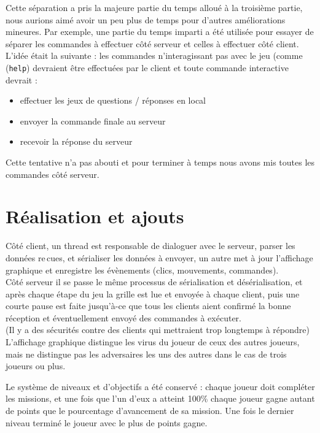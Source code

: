 \documentclass[a4paper,french]{article}
\begin{document}
Cette séparation a pris la majeure partie du temps alloué à la troisième partie,
nous aurions aimé avoir un peu plus de temps pour d'autres améliorations mineures.
Par exemple, une partie du temps imparti a été utilisée pour essayer de séparer les commandes à effectuer côté serveur et celles
à effectuer côté client. L'idée était la suivante : les commandes n'interagissant pas avec le jeu (comme
(\texttt{help}) devraient être effectuées par le client et toute commande interactive devrait :
\begin{itemize}
	\item effectuer les jeux de questions / réponses en local
	\item envoyer la commande finale au serveur
	\item recevoir la réponse du serveur
\end{itemize}
Cette tentative n'a pas abouti et pour terminer \`a temps nous avons mis toutes les commandes
c\^ot\'e serveur.



\section{Réalisation et ajouts}

Côté client, un thread est responsable de dialoguer avec le serveur, parser les données re\,cues, et
sérialiser les données à envoyer, un autre met à jour l'affichage graphique et enregistre les
évènements (clics, mouvements, commandes).\\

Côté serveur il se passe le même processus de sérialisation et désérialisation, et après chaque
étape du jeu la grille est lue et envoyée à chaque client, puis une courte pause est faite jusqu'à-ce que
tous les clients aient confirmé la bonne réception et éventuellement envoyé des commandes à exécuter.\\
(Il y a des s\'ecurit\'es contre des clients qui mettraient trop longtemps \`a répondre)\\

L'affichage graphique distingue les virus du joueur de ceux des autres joueurs, mais ne distingue pas les
adversaires les uns des autres dans le cas de trois joueurs ou plus.

Le système de niveaux et d'objectifs a été conservé : chaque joueur doit compléter les missions,
et une fois que l'un d'eux a atteint 100\% chaque joueur gagne autant de points que le pourcentage d'avancement
de sa mission. Une fois le dernier niveau terminé le joueur avec le plus de points gagne.
\end{document}
